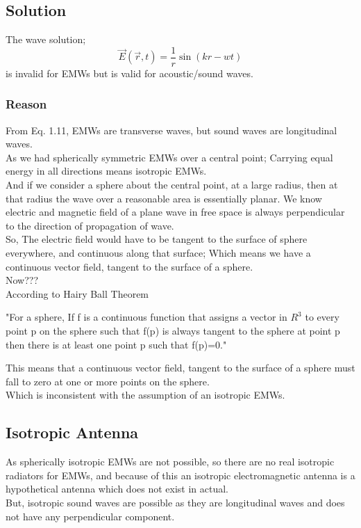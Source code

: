 \subsection{Solution}
The wave solution;\\
\begin{equation}
\vec{E}(\vec{r},t) = \frac{1}{r}\sin(kr-wt)
\end{equation}
is invalid for EMWs but is valid for acoustic/sound waves.\\

\subsubsection{Reason}
From Eq. 1.11, EMWs are transverse waves, but sound waves are longitudinal waves.\\
As we had spherically symmetric EMWs over a central point;
Carrying equal energy in all directions means isotropic EMWs.\\
And if we consider a sphere about the central point, at a large radius, then at that radius the wave over a reasonable area is essentially planar. We know electric and magnetic field of a plane wave in free space is always perpendicular to the direction of propagation of wave.\\
So, The electric field would have to be tangent to the surface of sphere everywhere, and continuous along that surface; Which means we have a continuous vector field, tangent to the surface of a sphere.\\
Now???\\
According to Hairy Ball Theorem
\begin{center}
	"For a sphere, If f is a continuous function that assigns a vector in $R^3$ to every point p on the sphere such that f(p) is always tangent to the sphere at point p then there is at least one point p such that f(p)=0."\\
\end{center}
This means that a continuous vector field, tangent to the surface of a sphere must fall to zero at one or more points on the sphere.\\
Which is inconsistent with the assumption of an isotropic EMWs.

\subsection{Isotropic Antenna}
As spherically isotropic EMWs are not possible, so there are no real isotropic radiators for EMWs, and because of this an isotropic electromagnetic antenna is a hypothetical antenna which does not exist in actual.\\
But, isotropic sound waves are possible as they are longitudinal waves and does not have any perpendicular component.

